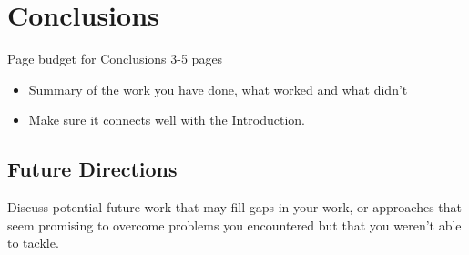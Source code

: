 \chapter{Conclusions}
\label{ch:conclusion}
Page budget for Conclusions 3-5 pages
\begin{itemize}
    \item Summary of the work you have done, what worked and what didn't
    \item Make sure it connects well with the Introduction.
\end{itemize}

\section{Future Directions}
Discuss potential future work that may fill gaps in your work, or approaches that seem promising to overcome problems you encountered but that you weren't able to tackle.